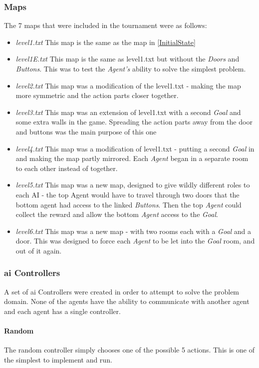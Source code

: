 \documentclass{IEEEtran}
\begin{document}
\subsubsection{Maps}
The 7 maps that were included in the tournament were as follows:
\begin{itemize}
\item{\emph{level1.txt} This map is the same as the map in \ref{InitialState}}
\item{\emph{level1E.txt} This map is the same as level1.txt but without the \emph{Doors} and \emph{Buttons}. This was to test the \emph{Agent's} ability to solve the simplest problem.}
\item{\emph{level2.txt} This map was a modification of the level1.txt - making the map more symmetric and the action parts closer together.}
\item{\emph{level3.txt} This map was an extension of level1.txt with a second \emph{Goal} and some extra walls in the game. Spreading the action parts away from the door and buttons was the main purpose of this one}
\item{\emph{level4.txt} This map was a modification of level1.txt - putting a second \emph{Goal} in and making the map partly mirrored. Each \emph{Agent} began in a separate room to each other instead of together.}
\item{\emph{level5.txt} This map was a new map, designed to give wildly different roles to each AI - the top Agent would have to travel through two doors that the bottom agent had access to the linked \emph{Buttons}. Then the top \emph{Agent} could collect the reward and allow the bottom \emph{Agent} access to the \emph{Goal}.}
\item{\emph{level6.txt} This map was a new map - with two rooms each with a \emph{Goal} and a door. This was designed to force each \emph{Agent} to be let into the \emph{Goal} room, and out of it again.}
\end{itemize}

\subsubsection{\gls{ai} Controllers}
A set of \gls{ai} Controllers were created in order to attempt to solve the problem domain. None of the agents have the ability to communicate with another agent and each agent has a single controller.
\paragraph{Random}
The random controller simply chooses one of the possible 5 actions. This is one of the simplest to implement and run.

\end{document}
